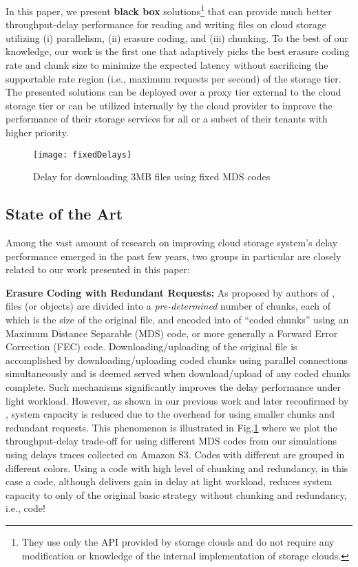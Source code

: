 \documentclass[journal]{IEEEtran}
\newcommand{\onewidth}{0.74\columnwidth}
\begin{document}
In this paper, we present  {\bf black box} solutions\footnote{They use only the API provided by storage clouds and do not require any modification or knowledge of the internal implementation of storage clouds.} that can provide much better throughput-delay performance for reading and writing files on cloud storage utilizing (i) parallelism, (ii) erasure coding, and (iii) chunking. To the best of our knowledge, our work is the first one that adaptively picks the best erasure coding rate and chunk size to minimize the expected latency without sacrificing the supportable rate region (i.e., maximum requests per second) of the storage tier.  The presented solutions can be deployed over a proxy tier external to the cloud storage tier or can be utilized internally by the cloud provider to improve the performance of their storage services for all or a subset of their tenants with higher priority.





\begin{figure}[!t]
\centering
\texttt{[image: fixedDelays]}
\caption{Delay for downloading 3MB files using fixed MDS codes}
\label{fig:fixedDelays}
\end{figure}

\subsection{State of the Art}
Among the vast amount of research on improving cloud storage system's delay performance emerged in the past few years, two groups in particular are closely related to our work presented in this paper:

{\bf Erasure Coding with Redundant Requests:} As proposed by authors of \cite{fastcloud,Longbocodeingincloud, MDS-queue}, files (or objects) are divided into a {\em pre-determined} number of  chunks, each of which is  the size of the original file, and encoded into  of ``coded chunks'' using an  Maximum Distance Separable (MDS) code, or more generally a Forward Error Correction (FEC) code. Downloading/uploading of the original file is accomplished by downloading/uploading  coded chunks using parallel connections simultaneously and is deemed served when download/upload of any  coded chunks complete. Such mechanisms significantly improves the delay performance under light workload. However, as shown in our previous work \cite{fastcloud} and later reconfirmed by \cite{MDS-queue}, system capacity is reduced due to the overhead for using smaller chunks and redundant requests. This phenomenon is illustrated in Fig.\ref{fig:fixedDelays} where we plot the throughput-delay trade-off for using different MDS codes from our simulations using delays traces collected on Amazon S3. Codes with different  are grouped in different colors. Using a code with high level of chunking and redundancy, in this case a  code, although delivers  gain in delay at light workload, reduces system capacity to only  of the original basic strategy without chunking and redundancy, i.e.,  code!
\end{document}
